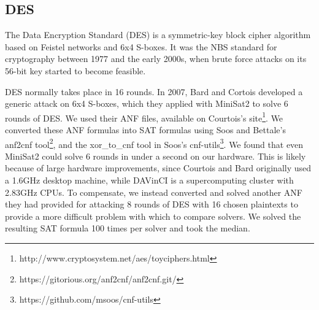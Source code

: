 \subsection{DES}
\label{sec:encoding:des}

The Data Encryption Standard (DES) is a symmetric-key block cipher algorithm based on Feistel networks and 6x4 S-boxes. It was the NBS standard for cryptography between 1977 and the early 2000s, when brute force attacks on its 56-bit key started to become feasible.\cite{Simmons16}

DES normally takes place in 16 rounds. In 2007, Bard and Cortois\cite{CB07} developed a generic attack on 6x4 S-boxes, which they applied with MiniSat2 to solve 6 rounds of DES.  We used their ANF files, available on Courtois's site\footnote{http://www.cryptosystem.net/aes/toyciphers.html}. We converted these ANF formulas into SAT formulas using Soos and Bettale's anf2cnf tool\footnote{https://gitorious.org/anf2cnf/anf2cnf.git/}, and the xor\_to\_cnf tool in Soos's cnf-utils\cite{SNC09}\footnote{https://github.com/msoos/cnf-utils}. We found that even MiniSat2 could solve 6 rounds in under a second on our hardware. This is likely because of large hardware improvements, since Courtois and Bard originally used a 1.6GHz desktop machine, while DAVinCI is a supercomputing cluster with 2.83GHz CPUs. To compensate, we instead converted and solved another ANF they had provided for attacking 8 rounds of DES with 16 chosen plaintexts to provide a more difficult problem with which to compare solvers. We solved the resulting SAT formula 100 times per solver and took the median.